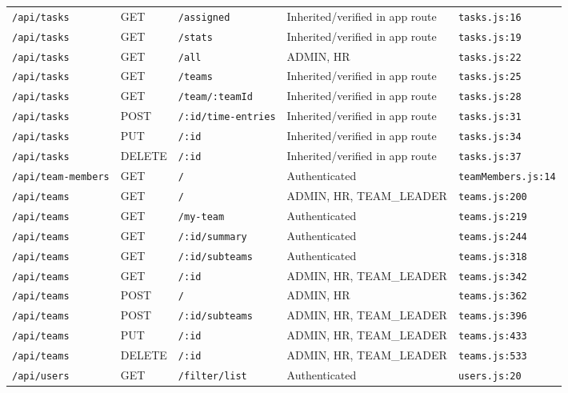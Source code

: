 \begin{landscape}
\begin{longtable}{p{}p{}p{}p{}p{}}
\texttt{/api/tasks} & GET & \texttt{/assigned} & Inherited/verified in app route & \texttt{tasks.js:16}\\
\texttt{/api/tasks} & GET & \texttt{/stats} & Inherited/verified in app route & \texttt{tasks.js:19}\\
\texttt{/api/tasks} & GET & \texttt{/all} & ADMIN,  HR & \texttt{tasks.js:22}\\
\texttt{/api/tasks} & GET & \texttt{/teams} & Inherited/verified in app route & \texttt{tasks.js:25}\\
\texttt{/api/tasks} & GET & \texttt{/team/:teamId} & Inherited/verified in app route & \texttt{tasks.js:28}\\
\texttt{/api/tasks} & POST & \texttt{/:id/time-entries} & Inherited/verified in app route & \texttt{tasks.js:31}\\
\texttt{/api/tasks} & PUT & \texttt{/:id} & Inherited/verified in app route & \texttt{tasks.js:34}\\
\texttt{/api/tasks} & DELETE & \texttt{/:id} & Inherited/verified in app route & \texttt{tasks.js:37}\\
\texttt{/api/team-members} & GET & \texttt{/} & Authenticated & \texttt{teamMembers.js:14}\\
\texttt{/api/teams} & GET & \texttt{/} & ADMIN,  HR,  TEAM\_LEADER & \texttt{teams.js:200}\\
\texttt{/api/teams} & GET & \texttt{/my-team} & Authenticated & \texttt{teams.js:219}\\
\texttt{/api/teams} & GET & \texttt{/:id/summary} & Authenticated & \texttt{teams.js:244}\\
\texttt{/api/teams} & GET & \texttt{/:id/subteams} & Authenticated & \texttt{teams.js:318}\\
\texttt{/api/teams} & GET & \texttt{/:id} & ADMIN,  HR,  TEAM\_LEADER & \texttt{teams.js:342}\\
\texttt{/api/teams} & POST & \texttt{/} & ADMIN,  HR & \texttt{teams.js:362}\\
\texttt{/api/teams} & POST & \texttt{/:id/subteams} & ADMIN,  HR,  TEAM\_LEADER & \texttt{teams.js:396}\\
\texttt{/api/teams} & PUT & \texttt{/:id} & ADMIN,  HR,  TEAM\_LEADER & \texttt{teams.js:433}\\
\texttt{/api/teams} & DELETE & \texttt{/:id} & ADMIN,  HR,  TEAM\_LEADER & \texttt{teams.js:533}\\
\texttt{/api/users} & GET & \texttt{/filter/list} & Authenticated & \texttt{users.js:20}\\

\end{longtable}
\end{landscape}
